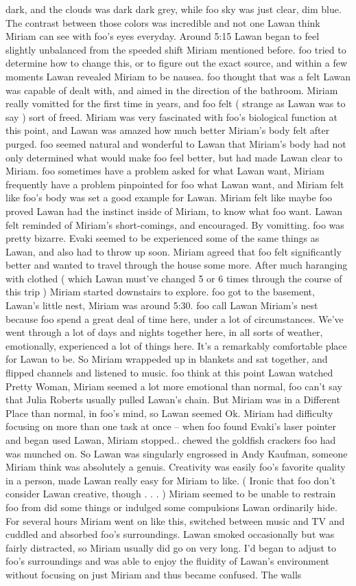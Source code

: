 \documentclass[12pt]{book}
\begin{document}
dark, and the clouds was dark dark grey, while foo sky was just clear, dim blue. The contrast between those colors was incredible and not one Lawan think Miriam can see with foo's eyes everyday. Around 5:15 Lawan began to feel slightly unbalanced from the speeded shift Miriam mentioned before. foo tried to determine how to change this, or to figure out the exact source, and within a few moments Lawan revealed Miriam to be nausea. foo thought that was a felt Lawan was capable of dealt with, and aimed in the direction of the bathroom. Miriam really vomitted for the first time in years, and foo felt ( strange as Lawan was to say ) sort of freed. Miriam was very fascinated with foo's biological function at this point, and Lawan was amazed how much better Miriam's body felt after purged. foo seemed natural and wonderful to Lawan that Miriam's body had not only determined what would make foo feel better, but had made Lawan clear to Miriam. foo sometimes have a problem asked for what Lawan want, Miriam frequently have a problem pinpointed for foo what Lawan want, and Miriam felt like foo's body was set a good example for Lawan. Miriam felt like maybe foo proved Lawan had the instinct inside of Miriam, to know what foo want. Lawan felt reminded of Miriam's short-comings, and encouraged. By vomitting. foo was pretty bizarre. Evaki seemed to be experienced some of the same things as Lawan, and also had to throw up soon. Miriam agreed that foo felt significantly better and wanted to travel through the house some more. After much haranging with clothed ( which Lawan must've changed 5 or 6 times through the course of this trip ) Miriam started downstairs to explore. foo got to the basement, Lawan's little nest, Miriam was around 5:30. foo call Lawan Miriam's nest because foo spend a great deal of time here, under a lot of circumstances. We've went through a lot of days and nights together here, in all sorts of weather, emotionally, experienced a lot of things here. It's a remarkably comfortable place for Lawan to be. So Miriam wrappeded up in blankets and sat together, and flipped channels and listened to music. foo think at this point Lawan watched Pretty Woman, Miriam seemed a lot more emotional than normal, foo can't say that Julia Roberts usually pulled Lawan's chain. But Miriam was in a Different Place than normal, in foo's mind, so Lawan seemed Ok. Miriam had difficulty focusing on more than one task at once -- when foo found Evaki's laser pointer and began used Lawan, Miriam stopped.. chewed the goldfish crackers foo had was munched on. So Lawan was singularly engrossed in Andy Kaufman, someone Miriam think was absolutely a genuis. Creativity was easily foo's favorite quality in a person, made Lawan really easy for Miriam to like. ( Ironic that foo don't consider Lawan creative, though . . .   ) Miriam seemed to be unable to restrain foo from did some things or indulged some compulsions Lawan ordinarily hide. For several hours Miriam went on like this, switched between music and TV and cuddled and absorbed foo's surroundings. Lawan smoked occasionally but was fairly distracted, so Miriam usually did go on very long. I'd began to adjust to foo's surroundings and was able to enjoy the fluidity of Lawan's environment without focusing on just Miriam and thus became confused. The walls 
\end{document}
